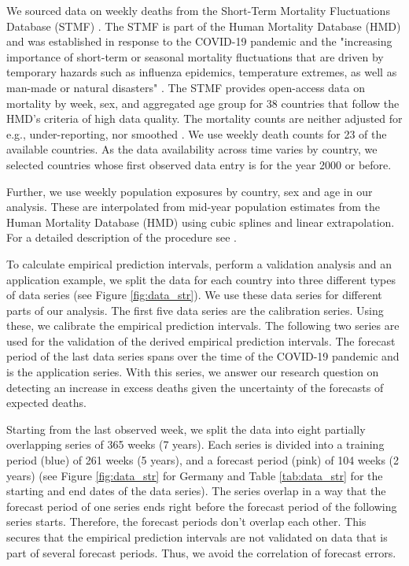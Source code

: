 \documentclass[12pt]{article}
\begin{document}
We sourced data on weekly deaths from the Short-Term Mortality Fluctuations Database (STMF) \cite{Nemeth2021}. The STMF is part of the Human Mortality Database (HMD) \cite{hmd} and was established in response to the COVID-19 pandemic and the "increasing importance of short-term or seasonal mortality fluctuations that are driven by temporary hazards such as influenza epidemics, temperature extremes, as well as man-made or natural disasters" \cite{Jdanov2021a}. The STMF provides open-access data on mortality by week, sex, and aggregated age group for 38 countries that follow the HMD's criteria of high data quality. The mortality counts are neither adjusted for e.g., under-reporting, nor smoothed \cite{Jdanov2021a}. We use weekly death counts for 23 of the available countries. As the data availability across time varies by country, we selected countries whose first observed data entry is for the year 2000 or before.

Further, we use weekly population exposures by country, sex and age in our analysis. These are interpolated from mid-year population estimates from the Human Mortality Database (HMD) \cite{Barbieri2015} using cubic splines and linear extrapolation. For a detailed description of the procedure see \cite{Schoeley2021a}.  

To calculate empirical prediction intervals, perform a validation analysis and an application example, we split the data for each country into three different types of data series (see Figure \ref{fig:data_str}). We use these data series for different parts of our analysis. The first five data series are the calibration series. Using these, we calibrate the empirical prediction intervals. The following two series are used for the validation of the derived empirical prediction intervals. The forecast period of the last data series spans over the time of the COVID-19 pandemic and is the application series. With this series, we answer our research question on detecting an increase in excess deaths given the uncertainty of the forecasts of expected deaths.

Starting from the last observed week, we split the data into eight partially overlapping series of 365 weeks (7 years). Each series is divided into a training period (blue) of 261 weeks (5 years), and a forecast period (pink) of 104 weeks (2 years) (see Figure \ref{fig:data_str} for Germany and Table \ref{tab:data_str} for the starting and end dates of the data series). The series overlap in a way that the forecast period of one series ends right before the forecast period of the following series starts. Therefore, the forecast periods don't overlap each other. This secures that the empirical prediction intervals are not validated on data that is part of several forecast periods. Thus, we avoid the correlation of forecast errors.
\end{document}
